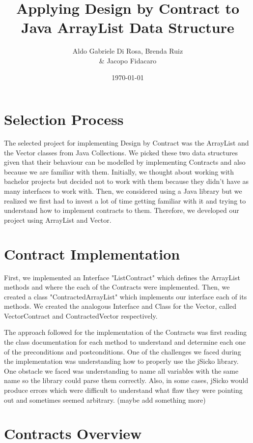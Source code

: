 \documentclass[a4paper]{article}
\title{Applying Design by Contract to \\ Java ArrayList Data Structure}
\author{Aldo Gabriele Di Rosa, Brenda Ruiz \\ \& Jacopo Fidacaro}
\date{\today}
\begin{document}
\maketitle

\section{Selection Process}

The selected project for implementing Design by Contract was the ArrayList and the Vector classes from Java Collections. We picked these two data structures given that their behaviour can be modelled by implementing Contracts and also because we are familiar with them. Initially, we thought about working with bachelor projects but decided not to work with them because they didn't have as many interfaces to work with. Then, we considered using a Java library but we realized we first had to invest a lot of time getting familiar with it and trying to understand how to implement contracts to them. Therefore, we developed our project using ArrayList and Vector.


\section{Contract Implementation}

First, we implemented an Interface "ListContract" which defines the ArrayList methods and where the each of the Contracts were implemented. Then, we created a class "ContractedArrayList" which implements our interface each of its methods. We created the analogous Interface and Class for the Vector, called VectorContract and ContractedVector respectively. \par
The approach followed for the implementation of the Contracts was first reading the class documentation for each method to understand and determine each one of the preconditions and postconditions. 
One of the challenges we faced during the implementation was understanding how to properly use the jSicko library. One obstacle we faced was understanding to name all variables with the same name so the library could parse them correctly. Also, in some cases, jSicko would produce errors which were difficult to understand what flaw they were pointing out and sometimes seemed arbitrary. (maybe add something more)

\section{Contracts Overview}
\end{document}
